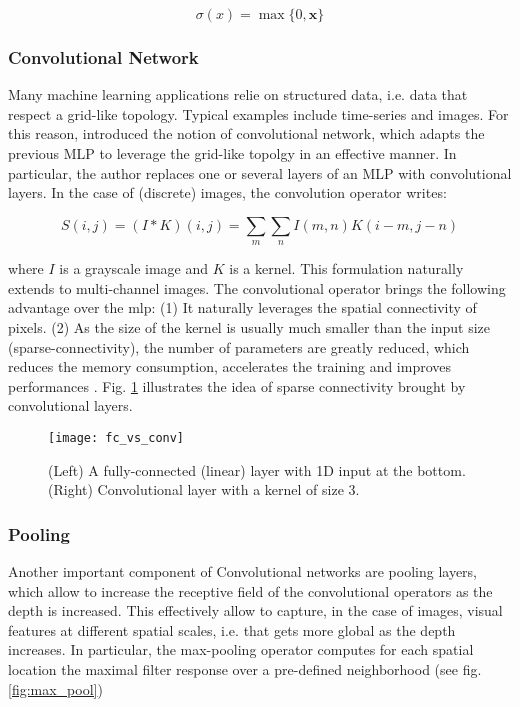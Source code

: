 \begin{equation}
\sigma(x) = \max \{0, \bm{x}\}
\end{equation}

\subsubsection{Convolutional Network}
Many machine learning applications relie on structured data, i.e. data that respect a grid-like topology.
Typical examples include time-series and images.
For this reason, \cite{lecun95} introduced the notion of convolutional network, which adapts the previous MLP to leverage the grid-like topolgy in an effective manner.
In particular, the author replaces one or several layers of an MLP with convolutional layers.
In the case of (discrete) images, the convolution operator writes:

\begin{equation}
S(i,j) = (I * K)(i,j) = \sum_{m} \sum_{n} I(m,n) K(i-m, j-n)
\end{equation}

where $I$ is a grayscale image and $K$ is a kernel.
This formulation naturally extends to multi-channel images.
The convolutional operator brings the following advantage over the \gls{mlp}: (1) It naturally leverages the spatial connectivity of pixels.
(2) As the size of the kernel is usually much smaller than the input size (sparse-connectivity), the number of parameters are greatly reduced, which reduces the memory consumption, accelerates the training and improves performances \cite{lecun95}.
Fig. \ref{fig:cnn_con} illustrates the idea of sparse connectivity brought by convolutional layers.

\begin{figure}[!htpb]
  \centering
  \texttt{[image: fc\_vs\_conv]}
  \caption{(Left) A fully-connected (linear) layer with 1D input at the bottom. (Right) Convolutional layer with a kernel of size 3.}
  \label{fig:cnn_con}
\end{figure}

\subsubsection{Pooling}

Another important component of Convolutional networks are pooling layers, which allow to increase the receptive field of the convolutional operators as the depth is increased.
This effectively allow to capture, in the case of images, visual features at different spatial scales, i.e. that gets more global as the depth increases.
In particular, the max-pooling operator computes for each spatial location the maximal filter response over a pre-defined neighborhood (see fig. \ref{fig:max_pool})

